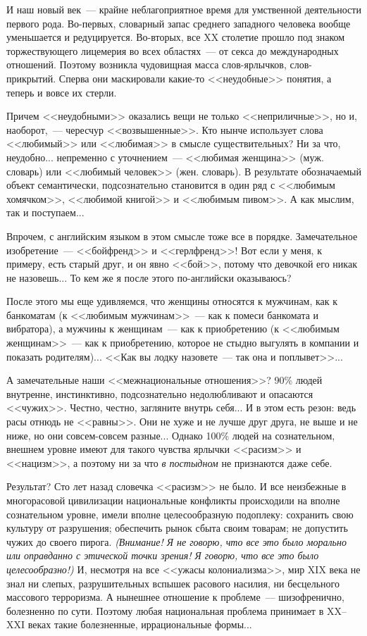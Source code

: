 \documentclass{scrbook}
\newcommand{\flqq}{<<}
\newcommand{\frqq}{>>}
\newcommand{\mdash}{~--- }
\newcommand{\ndash}{--}
\newcommand{\commamdash}{~--- } %
\begin{document}
И наш новый век{\mdash}крайне неблагоприятное время для умственной деятельности первого рода. Во-первых, словарный запас среднего западного человека вообще уменьшается и редуцируется. Во-вторых, все XX столетие прошло под знаком торжествующего лицемерия во всех областях{\mdash}от секса до международных отношений. Поэтому возникла чудовищная масса слов-ярлычков, слов-прикрытий. Сперва они маскировали какие-то {\flqq}неудобные{\frqq} понятия, а теперь и вовсе их стерли.

Причем {\flqq}неудобными{\frqq} оказались вещи не только {\flqq}неприличные{\frqq}, но и, наоборот,{\commamdash}чересчур {\flqq}возвышенные{\frqq}. Кто нынче использует слова {\flqq}любимый{\frqq} или {\flqq}любимая{\frqq} в смысле существительных? Ни за что, неудобно... непременно с уточнением{\mdash}{\flqq}любимая женщина{\frqq} (муж. словарь) или {\flqq}любимый человек{\frqq} (жен. словарь). В результате обозначаемый объект семантически, подсознательно становится в один ряд с {\flqq}любимым хомячком{\frqq}, {\flqq}любимой книгой{\frqq} и {\flqq}любимым пивом{\frqq}. А как мыслим, так и поступаем...

Впрочем, с английским языком в этом смысле тоже все в порядке. Замечательное изобретение{\mdash}{\flqq}бойфренд{\frqq} и {\flqq}герлфренд{\frqq}! Вот если у меня, к примеру, есть старый друг, и он явно {\flqq}бой{\frqq}, потому что девочкой его никак не назовешь... То кем же я после этого по-английски оказываюсь?

После этого мы еще удивляемся, что женщины относятся к мужчинам, как к банкоматам (к {\flqq}любимым мужчинам{\frqq}{\mdash}как к помеси банкомата и вибратора), а мужчины к женщинам{\mdash}как к приобретению (к {\flqq}любимым женщинам{\frqq}{\mdash}как к приобретению, которое не стыдно выгулять в компании и показать родителям)... {\flqq}Как вы лодку назовете{\mdash}так она и поплывет{\frqq}...

А замечательные наши {\flqq}межнациональные отношения{\frqq}? 90\% людей внутренне, инстинктивно, подсознательно недолюбливают и опасаются {\flqq}чужих{\frqq}. Честно, честно, загляните внутрь себя... И в этом есть резон: ведь расы отнюдь не {\flqq}равны{\frqq}. Они не хуже и не лучше друг друга, не выше и не ниже, но они совсем-совсем разные... Однако 100\% людей на сознательном, внешнем уровне имеют для такого чувства ярлычки {\flqq}расизм{\frqq} и {\flqq}нацизм{\frqq}, а поэтому ни за что \emph{в постыдном} не признаются даже себе.

Результат? Сто лет назад словечка {\flqq}расизм{\frqq} не было. И все неизбежные в многорасовой цивилизации национальные конфликты происходили на вполне сознательном уровне, имели вполне целесообразную подоплеку: сохранить свою культуру от разрушения; обеспечить рынок сбыта своим товарам; не допустить чужих до своего пирога. \emph{(Внимание! Я не говорю, что все это было морально или оправданно с этической точки зрения! Я говорю, что все это было целесообразно!)} И, несмотря на все {\flqq}ужасы колониализма{\frqq}, мир XIX века не знал ни слепых, разрушительных вспышек расового насилия, ни бесцельного массового терроризма. А нынешнее отношение к проблеме{\mdash}шизофренично, болезненно по сути. Поэтому любая национальная проблема принимает в XX{\ndash}XXI веках такие болезненные, иррациональные формы...
\end{document}
